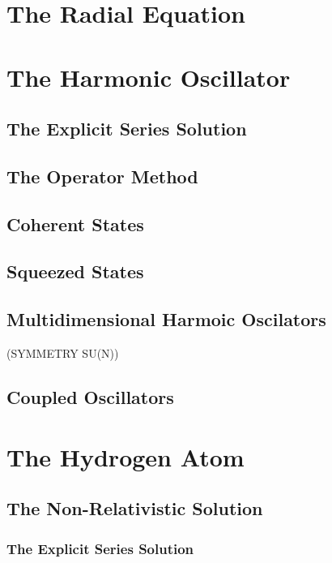 \documentclass[12pt]{extarticle}
\theoremstyle{definition}
\begin{document}
\section{The Radial Equation}



\section{The Harmonic Oscillator}

\subsection{The Explicit Series Solution}

\subsection{The Operator Method}

\subsection{Coherent States}

\subsection{Squeezed States}

\subsection{Multidimensional Harmoic Oscilators}

(SYMMETRY SU(N))

\subsection{Coupled Oscillators}




\section{The Hydrogen Atom}

\subsection{The Non-Relativistic Solution}

\subsubsection{The Explicit Series Solution}
\end{document}
